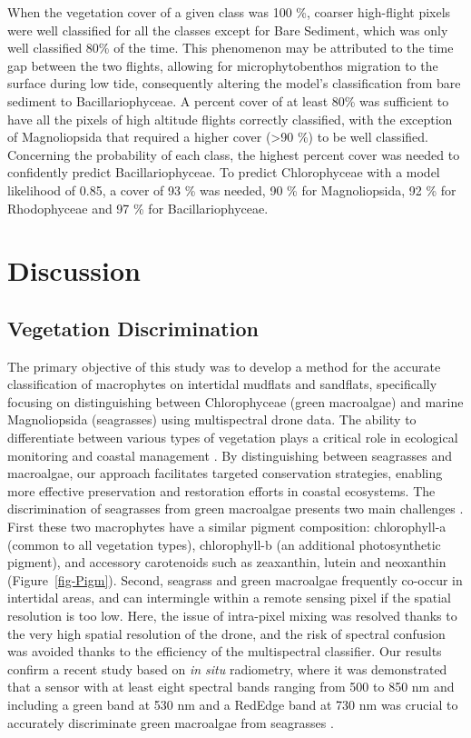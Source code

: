 \documentclass[
  number]{elsarticle}
\begin{document}
When the vegetation cover of a given class was 100 \%, coarser
high-flight pixels were well classified for all the classes except for
Bare Sediment, which was only well classified 80\% of the time. This
phenomenon may be attributed to the time gap between the two flights,
allowing for microphytobenthos migration to the surface during low tide,
consequently altering the model's classification from bare sediment to
Bacillariophyceae. A percent cover of at least 80\% was sufficient to
have all the pixels of high altitude flights correctly classified, with
the exception of Magnoliopsida that required a higher cover
(\textgreater90 \%) to be well classified. Concerning the probability of
each class, the highest percent cover was needed to confidently predict
Bacillariophyceae. To predict Chlorophyceae with a model likelihood of
0.85, a cover of 93 \% was needed, 90 \% for Magnoliopsida, 92 \% for
Rhodophyceae and 97 \% for Bacillariophyceae.

\section{Discussion}\label{discussion}

\subsection{Vegetation Discrimination}\label{vegetation-discrimination}

The primary objective of this study was to develop a method for the
accurate classification of macrophytes on intertidal mudflats and
sandflats, specifically focusing on distinguishing between Chlorophyceae
(green macroalgae) and marine Magnoliopsida (seagrasses) using
multispectral drone data. The ability to differentiate between various
types of vegetation plays a critical role in ecological monitoring and
coastal management \citep{WFD2000}. By distinguishing between seagrasses
and macroalgae, our approach facilitates targeted conservation
strategies, enabling more effective preservation and restoration efforts
in coastal ecosystems. The discrimination of seagrasses from green
macroalgae presents two main challenges \citetext{\citealp[
]{oiry2021using}; \citealp[
]{bannari2022}; \citealp{veettil2020opportunities}}. First these two
macrophytes have a similar pigment composition: chlorophyll-a (common to
all vegetation types), chlorophyll-b (an additional photosynthetic
pigment), and accessory carotenoids such as zeaxanthin, lutein and
neoxanthin (Figure~\ref{fig-Pigm}). Second, seagrass and green
macroalgae frequently co-occur in intertidal areas, and can intermingle
within a remote sensing pixel if the spatial resolution is too low.
Here, the issue of intra-pixel mixing was resolved thanks to the very
high spatial resolution of the drone, and the risk of spectral confusion
was avoided thanks to the efficiency of the multispectral classifier.
Our results confirm a recent study based on \emph{in situ} radiometry,
where it was demonstrated that a sensor with at least eight spectral
bands ranging from 500 to 850 nm and including a green band at 530 nm
and a RedEdge band at 730 nm was crucial to accurately discriminate
green macroalgae from seagrasses \citep{Davies2023}.
\end{document}

